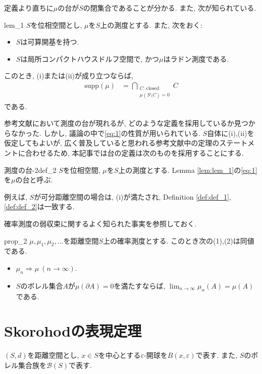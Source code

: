 定義より直ちに$\mu$の台が$S$の閉集合であることが分かる.
また, 次が知られている.

\begin{lemma}{}{lem_1}
    $S$を位相空間とし, $\mu$を$S$上の測度とする.
    また, 次をおく:
    \begin{itemize}
        \item[(i)] $S$は可算開基を持つ.
        \item[(ii)] $S$は局所コンパクトハウスドルフ空間で, かつ$\mu$はラドン測度である.
    \end{itemize}
    このとき, (i)または(ii)が成り立つならば,
    \begin{align}
        \textrm{supp}(\mu) & = \bigcap_{\substack{\text{$C$: closed} \\ \mu(S\setminus C)=0}}C \label{eq:1}
    \end{align}
    である.
\end{lemma}

参考文献において測度の台が現れるが, どのような定義を採用しているか見つからなかった.
しかし, 議論の中で\eqref{eq:1}の性質が用いられている.
$S$自体に(i),(ii)を仮定してもよいが, 広く普及していると思われる参考文献中の定理のステートメントに合わせるため, 本記事では台の定義は次のものを採用することにする.

\begin{definition}{測度の台-2}{def_2}
    $S$を位相空間, $\mu$を$S$上の測度とする. Lemma \ref{lem:lem_1}の\eqref{eq:1}を$\mu$の台と呼ぶ.
\end{definition}

例えば, $S$が可分距離空間の場合は, (i)が満たされ, Definition \ref{def:def_1}, \ref{def:def_2}は一致する.

確率測度の弱収束に関するよく知られた事実を参照しておく.

\begin{proposition}{}{prop_2}
    $\mu,\mu_1,\mu_2,\dots$を距離空間$S$上の確率測度とする. このとき次の(1),(2)は同値である.
    \begin{itemize}
        \item[(1)] $\mu_n\Rightarrow \mu~(n\to\infty)$.
        \item[(2)] $S$のボレル集合$A$が$\mu(\partial A)=0$を満たすならば, $\lim_{n\to\infty}\mu_n(A)=\mu(A)$である.
    \end{itemize}
\end{proposition}

\section{Skorohodの表現定理}
$(S,d)$を距離空間とし, $x\in S$を中心とする$\varepsilon$-開球を$B(x,\varepsilon)$で表す.
また, $S$のボレル集合族を$\mathcal{B}(S)$で表す.

